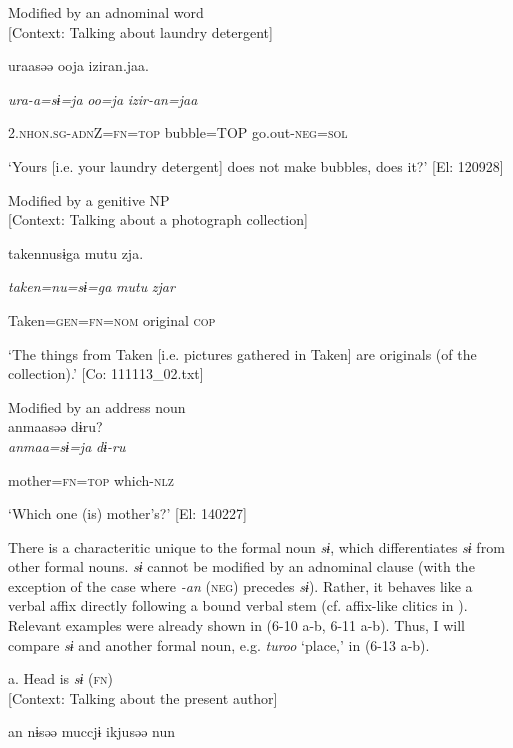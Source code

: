 \ea\label{ex:6-12}
\ea Modified by an adnominal word\\{}
[Context: Talking about laundry detergent]

{\TM}
\gll uraasəə  ooja  iziran.jaa.

      \textit{ura-a=sɨ=ja}  \textit{oo=ja}  \textit{izir-an=jaa}

      2.\textsc{nhon}.\textsc{sg}-\textsc{adn}Z=\textsc{fn}=\textsc{top}  bubble=TOP  go.out-\textsc{neg}=\textsc{sol}

\glt ‘Yours [i.e. your laundry detergent] does not make bubbles, does it?’ [El: 120928]

 \ex Modified by a genitive NP\\{}
[Context: Talking about a photograph collection]

{\TM}
\gll {\textbar}taken{\textbar}nusɨga  mutu  zja.

      \textit{taken=nu=sɨ=ga}  \textit{mutu}  \textit{zjar}

      Taken=\textsc{gen}=\textsc{fn}=\textsc{nom}  original  \textsc{cop}

\glt ‘The things from Taken [i.e. pictures gathered in Taken] are originals (of the collection).’ [Co: 111113\_02.txt]
\z

 \ex Modified by an address noun\\
{\TM}
\gll  anmaasəə  dɨru?\\

      \textit{anmaa=sɨ=ja}  \textit{dɨ-ru}

      mother=\textsc{fn}=\textsc{top}  which-\textsc{nlz}

\glt ‘Which one (is) mother’s?’ [El: 140227]

There is a characteritic unique to the formal noun \textit{sɨ}, which differentiates \textit{sɨ} from other formal nouns. \textit{sɨ} cannot be modified by an adnominal clause (with the exception of the case where \textit{{}-an} (\textsc{neg}) precedes \textit{sɨ}). Rather, it behaves like a verbal affix directly following a bound verbal stem (cf. affix-like clitics in ). Relevant examples were already shown in (6-10 a-b, 6-11 a-b). Thus, I will compare \textit{sɨ} and another formal noun, e.g. \textit{turoo} ‘place,’ in (6-13 a-b).

\ea\label{ex:6-13}
 a. Head is \textit{sɨ} (\textsc{fn})\\{}
[Context: Talking about the present author]

{\TM}
\gll an  nɨsəə  muccjɨ  ikjusəə  nun

